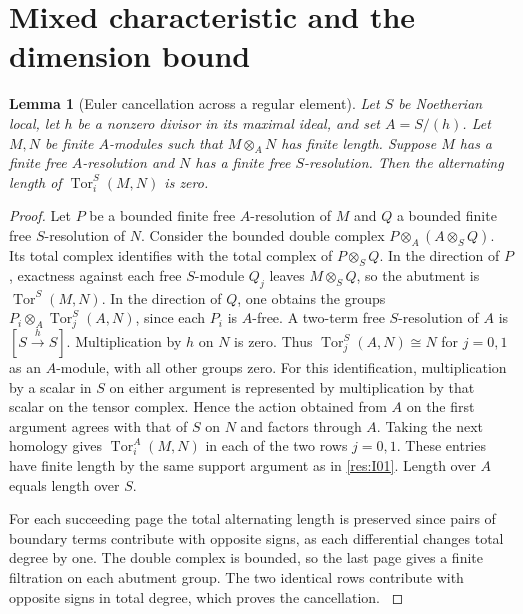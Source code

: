 \documentclass[11pt,oneside,openany]{book}
\newtheorem{lemma}[theorem]{Lemma}
\theoremstyle{definition}
\theoremstyle{remark}
\begin{document}
\section{Mixed characteristic and the dimension bound}

\begin{lemma}[Euler cancellation across a regular element]\label{res:I10}
Let \(S\) be Noetherian local, let \(h\) be a nonzero divisor in
its maximal ideal, and set \(A=S/(h)\). Let \(M,N\) be finite
\(A\)-modules such that \(M\otimes_A N\) has finite length.
Suppose \(M\) has a finite free \(A\)-resolution and \(N\) has a
finite free \(S\)-resolution. Then the alternating length of
\(\operatorname{Tor}_i^S(M,N)\) is zero.
\end{lemma}
\begin{proof}
Let \(P\) be a bounded finite free \(A\)-resolution of \(M\) and
\(Q\) a bounded finite free \(S\)-resolution of \(N\). Consider
the bounded double complex \(P\otimes_A(A\otimes_S Q)\).
Its total complex identifies with the total complex of
\(P\otimes_S Q\). In the direction of \(P\), exactness against
each free \(S\)-module \(Q_j\) leaves \(M\otimes_S Q\), so the
abutment is \(\operatorname{Tor}^S(M,N)\).
In the direction of \(Q\), one obtains the groups
\(P_i\otimes_A \operatorname{Tor}_j^S(A,N)\), since each \(P_i\)
is \(A\)-free. A two-term free \(S\)-resolution of \(A\) is
\([S\xrightarrow{h}S]\). Multiplication by \(h\) on \(N\) is
zero. Thus \(\operatorname{Tor}_j^S(A,N)\cong N\) for \(j=0,1\)
as an \(A\)-module, with all other groups zero. For this
identification, multiplication by a scalar in \(S\) on either
argument is represented by multiplication by that scalar on
the tensor complex. Hence the action obtained from \(A\) on
the first argument agrees with that of \(S\) on \(N\) and
factors through \(A\). Taking the next
homology gives \(\operatorname{Tor}_i^A(M,N)\) in each of the
two rows \(j=0,1\). These entries have finite length by the
same support argument as in \ref{res:I01}. Length over \(A\)
equals length over \(S\).

For each succeeding page the total alternating length is
preserved since pairs of boundary terms contribute with opposite
signs, as each differential changes total degree by one.
The double complex is bounded, so the last page gives a finite
filtration on each abutment group. The two identical rows
contribute with opposite signs in total degree, which proves
the cancellation. \cite[Chapter V, \S B.5]{serre-local}
\end{proof}
\end{document}
